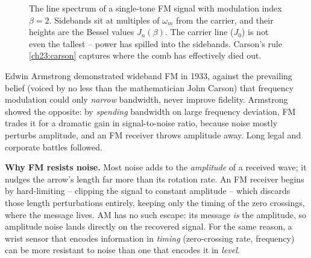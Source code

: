 \begin{figure}[H]
\centering
{}
\caption{The line spectrum of a single-tone FM signal with modulation index $\beta=2$.
Sidebands sit at multiples of $\omega_m$ from the carrier, and their heights are the
Bessel values $J_n(\beta)$. The carrier line ($J_0$) is not even the tallest -- power has
spilled into the sidebands. Carson's rule \eqref{ch23:carson} captures where the comb has
effectively died out.}
\label{ch23:fig-fmspec}
\end{figure}

\begin{historybox}
Edwin Armstrong demonstrated wideband FM in 1933, against the prevailing belief (voiced
by no less than the mathematician John Carson) that frequency modulation could only
\emph{narrow} bandwidth, never improve fidelity. Armstrong showed the
opposite: by \emph{spending} bandwidth on large frequency deviation, FM trades it for a
dramatic gain in signal-to-noise ratio, because noise mostly perturbs amplitude, and an
FM receiver throws amplitude away. Long legal and corporate battles
followed.
\end{historybox}

\begin{whybox}
\textbf{Why FM resists noise.} Most noise adds to the \emph{amplitude} of a received
wave; it nudges the arrow's length far more than its rotation rate. An FM receiver begins
by hard-limiting -- clipping the signal to constant amplitude -- which discards those
length perturbations entirely, keeping only the timing of the zero crossings, where the
message lives. AM has no such escape: its message \emph{is} the amplitude, so amplitude
noise lands directly on the recovered signal. For the same reason, a wrist sensor that
encodes information in \emph{timing} (zero-crossing rate, frequency) can be more resistant to noise
than one that encodes it in \emph{level}.
\end{whybox}

